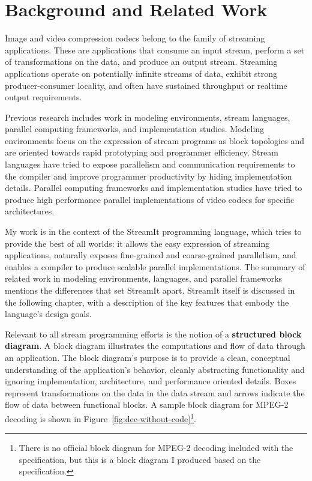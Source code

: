 \chapter{Background and Related Work}
\label{chapter:related}

Image and video compression codecs belong to the family of 
streaming applications. These are applications that 
consume an input stream, perform a
set of transformations on the data, and produce an output stream.
Streaming applications operate on potentially infinite streams of data,
exhibit strong producer-consumer locality, 
and often have sustained throughput or realtime output requirements. 

Previous research includes work in modeling 
environments, stream languages, parallel computing frameworks, and 
implementation studies. Modeling environments focus on the 
expression of stream programs as block topologies
and are oriented towards rapid 
prototyping and programmer efficiency.
Stream languages have tried to expose parallelism and 
communication requirements to the compiler and improve programmer 
productivity by hiding implementation details. Parallel computing 
frameworks and implementation studies have tried to produce high 
performance parallel implementations of video codecs for specific architectures. 

My work is in the context of the StreamIt programming language, 
which tries to provide the best of all worlds: it allows  
the easy expression of streaming applications, naturally 
exposes fine-grained and coarse-grained parallelism, 
and enables a compiler to produce 
scalable parallel implementations. The summary of related work in modeling
environments, languages, and parallel frameworks mentions the 
differences that set StreamIt apart. StreamIt itself is discussed 
in the following chapter, with a description of the key 
features that embody the language's design goals. 

Relevant to all stream programming efforts is the notion of 
a \textbf{structured block diagram}. A block diagram 
illustrates the computations and flow of data through an 
application. The block diagram's purpose is to provide a clean, 
conceptual understanding
of the application's behavior, cleanly abstracting functionality 
and ignoring implementation, architecture, and performance oriented details.
Boxes represent transformations on the data in the data stream 
and arrows indicate the flow of data between functional blocks.
A sample block diagram for MPEG-2 decoding
is shown in Figure~\ref{fig:dec-without-code}\footnote{There is no
official block diagram for MPEG-2 decoding included with the 
specification, but this is a block diagram I
produced based on the specification.}. 


